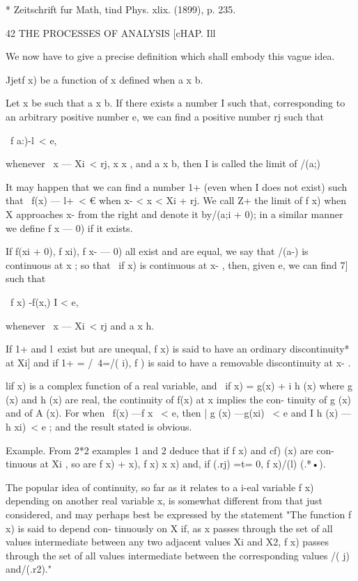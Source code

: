 * Zeitschrift fur Math, tind Phys. xlix. (1899), p. 235.



42 THE PROCESSES OF ANALYSIS [cHAP. Ill

We now have to give a precise definition which shall embody this vague
idea.

Jjetf x) be a function of x defined when a x b.

Let x be such that a x b. If there exists a number I such that,
corresponding to an arbitrary positive number e, we can find a
positive number rj such that

\ f a:)-l\ < e,

whenever \ x — Xi\ < rj, x x , and a x b, then I is called the limit
of /(a;)

It may happen that we can find a number 1+ (even when I does not
exist) such that \ f(x) — l+\ < € when x- < x < Xi + rj. We call Z+
the limit of f x) when X approaches x- from the right and denote it
by/(a;i + 0); in a similar manner we define f x — 0) if it exists.

If f(xi + 0), f xi), f x- — 0) all exist and are equal, we say that
/(a-) is continuous at x ; so that \ if x) is continuous at x- , then,
given e, we can find 7] such that

\ f x) -f(x,) I < e,

whenever \ x — Xi\ < rj and a x h.

If 1+ and l\ exist but are unequal, f x) is said to have an ordinary
discontinuity* at Xi] and if 1+ = /\ 4=/( i), f ) is said to have a
removable discontinuity at x- .

lif x) is a complex function of a real variable, and \ if x) = g(x) +
i h (x) where g (x) and h (x) are real, the continuity of f(x) at x
implies the con- tinuity of g (x) and of A (x). For when \ f(x) —f x \
< e, then | g (x) —g(xi) \ < e and I h (x) — h xi)\ < e ; and the
result stated is obvious.

Example. From 2*2 examples 1 and 2 deduce that if f x) and cf) (x) are
con- tinuous at Xi , so are f x) + x), f x) x x) and, if (.rj) =t= 0,
f x)/(l) (.*•).

The popular idea of continuity, so far as it relates to a i-eal
variable f x) depending on another real variable x, is somewhat
different from that just considered, and may perhaps best be expressed
by the statement "The function f x) is said to depend con- tinuously
on X if, as x passes through the set of all values intermediate
between any two adjacent values Xi and X2, f x) passes through the set
of all values intermediate between the corresponding values /( j)
and/(.r2)."

